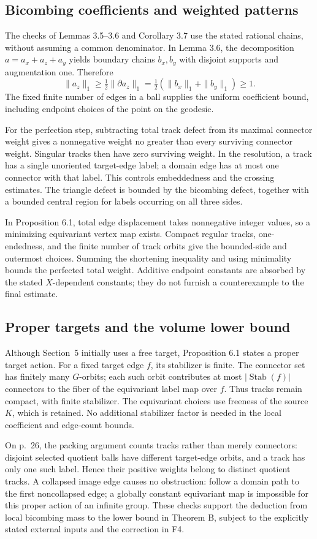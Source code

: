 \documentclass[10pt]{article}
\begin{document}
\subsection*{Bicombing coefficients and weighted patterns}
The checks of Lemmas 3.5–3.6 and Corollary 3.7 use the stated rational chains, without assuming a common denominator. In Lemma 3.6, the decomposition \(a=a_x+a_z+a_y\) yields boundary chains \(b_x,b_y\) with disjoint supports and augmentation one. Therefore \[\|a_z\|_1\ge\tfrac12\|\partial a_z\|_1
 =\tfrac12(\|b_x\|_1+\|b_y\|_1)\ge1.\] The fixed finite number of edges in a ball supplies the uniform coefficient bound, including endpoint choices of the point on the geodesic.\par
For the perfection step, subtracting total track defect from its maximal connector weight gives a nonnegative weight no greater than every surviving connector weight. Singular tracks then have zero surviving weight. In the resolution, a track has a single unoriented target-edge label; a domain edge has at most one connector with that label. This controls embeddedness and the crossing estimates. The triangle defect is bounded by the bicombing defect, together with a bounded central region for labels occurring on all three sides.\par
In Proposition 6.1, total edge displacement takes nonnegative integer values, so a minimizing equivariant vertex map exists. Compact regular tracks, one-endedness, and the finite number of track orbits give the bounded-side and outermost choices. Summing the shortening inequality and using minimality bounds the perfected total weight. Additive endpoint constants are absorbed by the stated \(X\)-dependent constants; they do not furnish a counterexample to the final estimate.\par
\subsection*{Proper targets and the volume lower bound}
Although Section 5 initially uses a free target, Proposition 6.1 states a proper target action. For a fixed target edge \(f\), its stabilizer is finite. The connector set has finitely many \(G\)-orbits; each such orbit contributes at most \(|\operatorname{Stab}(f)|\) connectors to the fiber of the equivariant label map over \(f\). Thus tracks remain compact, with finite stabilizer. The equivariant choices use freeness of the source \(K\), which is retained. No additional stabilizer factor is needed in the local coefficient and edge-count bounds.\par
On p. 26, the packing argument counts tracks rather than merely connectors: disjoint selected quotient balls have different target-edge orbits, and a track has only one such label. Hence their positive weights belong to distinct quotient tracks. A collapsed image edge causes no obstruction: follow a domain path to the first noncollapsed edge; a globally constant equivariant map is impossible for this proper action of an infinite group. These checks support the deduction from local bicombing mass to the lower bound in Theorem B, subject to the explicitly stated external inputs and the correction in F4.\par
\end{document}
